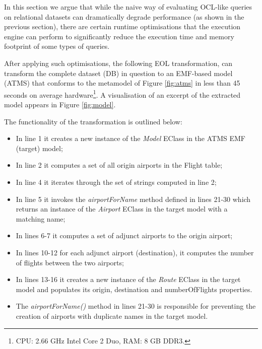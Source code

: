 In this section we argue that while the naive way of evaluating OCL-like queries on relational datasets can dramatically degrade performance (as shown in the previous section), there are certain runtime optimisations that the execution engine can perform to significantly reduce the execution time and memory footprint of some types of queries.

After applying such optimisations, the following EOL transformation, can transform the complete dataset (DB) in question to an EMF-based model (ATMS) that conforms to the metamodel of Figure \ref{fig:atms} in less than 45 seconds on average hardware\footnote{CPU: 2.66 GHz Intel Core 2 Duo, RAM: 8 GB DDR3.}. A visualisation of an excerpt of the extracted model appears in Figure \ref{fig:model}.

The functionality of the transformation is outlined below:
\begin{itemize}
  \item In line 1 it creates a new instance of the \emph{Model} EClass in the ATMS EMF (target) model;
  \item In line 2 it computes a set of all origin airports in the Flight table;
  \item In line 4 it iterates through the set of strings computed in line 2;
  \item In line 5 it invokes the \emph{airportForName} method defined in lines 21-30 which returns an instance of the \emph{Airport} EClass in the target model with a matching name;
  \item In lines 6-7 it computes a set of adjunct airports to the origin airport;
  \item In lines 10-12 for each adjunct airport (destination), it computes the number of flights between the two airports;
  \item In lines 13-16 it creates a new instance of the \emph{Route} EClass in the target model and populates its origin, destination and numberOfFlights properties.
  \item The \emph{airportForName()} method in lines 21-30 is responsible for preventing the creation of airports with duplicate names in the target model.
\end{itemize}

